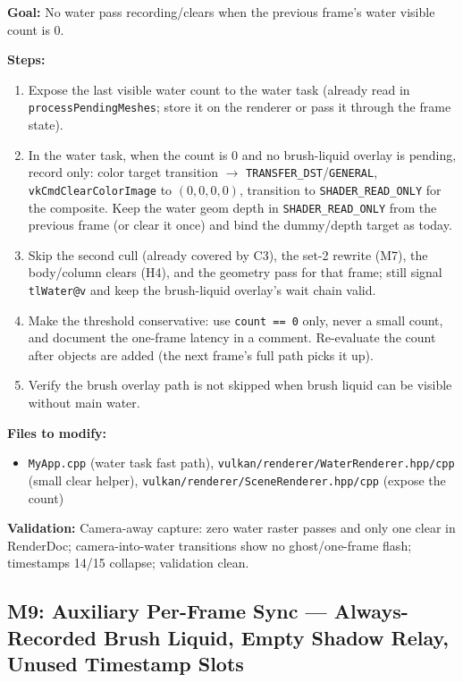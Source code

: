 \documentclass[11pt,a4paper]{article}
\begin{document}
\begin{tcolorbox}[promptbox={Prompt: Add a Clear-Only Fast Path for Empty Water Frames}]
\textbf{Goal:} No water pass recording/clears when the previous frame's water visible count is 0.

\textbf{Steps:}
\begin{enumerate}
    \item Expose the last visible water count to the water task (already read in \texttt{processPendingMeshes}; store it on the renderer or pass it through the frame state).
    \item In the water task, when the count is 0 and no brush-liquid overlay is pending, record only: color target transition $\to$ \texttt{TRANSFER\_DST}/\texttt{GENERAL},
    \texttt{vkCmdClearColorImage} to $(0,0,0,0)$, transition to \texttt{SHADER\_READ\_ONLY} for the composite. Keep the water geom depth in \texttt{SHADER\_READ\_ONLY} from the
    previous frame (or clear it once) and bind the dummy/depth target as today.
    \item Skip the second cull (already covered by C3), the set-2 rewrite (M7), the body/column clears (H4), and the geometry pass for that frame; still signal \texttt{tlWater@v}
    and keep the brush-liquid overlay's wait chain valid.
    \item Make the threshold conservative: use \texttt{count == 0} only, never a small count, and document the one-frame latency in a comment. Re-evaluate the count after
    objects are added (the next frame's full path picks it up).
    \item Verify the brush overlay path is not skipped when brush liquid can be visible without main water.
\end{enumerate}

\textbf{Files to modify:}
\begin{itemize}
    \item \texttt{MyApp.cpp} (water task fast path), \texttt{vulkan/renderer/WaterRenderer.hpp/cpp} (small clear helper), \texttt{vulkan/renderer/SceneRenderer.hpp/cpp} (expose
    the count)
\end{itemize}

\textbf{Validation:} Camera-away capture: zero water raster passes and only one clear in RenderDoc; camera-into-water transitions show no ghost/one-frame flash; timestamps
14/15 collapse; validation clean.
\end{tcolorbox}

\subsection{M9: Auxiliary Per-Frame Sync --- Always-Recorded Brush Liquid, Empty Shadow Relay, Unused Timestamp Slots}
\end{document}
